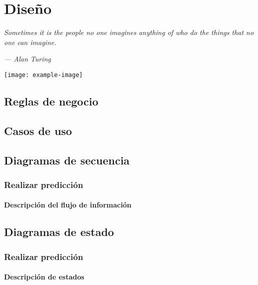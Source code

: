 \chapter{Diseño}\label{diseno}

\epigraph{\textit{Sometimes it is the people no one imagines anything of who do the things that no one can imagine.     
	}}{\textit{— Alan Turing}}
	\vspace*{8cm}
	\begin{center}
		\centering
		\texttt{[image: example-image]}
	\end{center}
	\thispagestyle{empty}
	\newpage
	\vspace*{1cm}

\section{Reglas de negocio}

\section{Casos de uso}

\section{Diagramas de secuencia}

\subsection{Realizar predicción}

\subsubsection{Descripción del flujo de información}

\section{Diagramas de estado}

\subsection{Realizar predicción}

\subsubsection{Descripción de estados}

